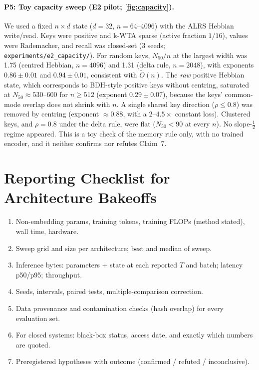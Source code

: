 \documentclass[11pt]{article}
\theoremstyle{remark}
\begin{document}
\paragraph{P5: Toy capacity sweep (E2 pilot; \cref{fig:capacity}).} We used a fixed $n\times d$ state ($d=32$, $n=64$--$4096$) with the
ALRS Hebbian write/read. Keys were positive and k-WTA sparse (active fraction $1/16$), values were Rademacher, and recall was closed-set
(3 seeds; \texttt{experiments/e2\_capacity/}). For random keys, $N_{50}/n$ at the largest width was 1.75 (centred Hebbian, $n{=}4096$) and 1.31
(delta rule, $n{=}2048$), with exponents $0.86\pm0.01$ and $0.94\pm0.01$, consistent with $\tilde O(n)$. The \emph{raw} positive
Hebbian state, which corresponds to BDH-style positive keys without centring, saturated at $N_{50}\approx530$--$600$ for $n\ge512$ (exponent
$0.29\pm0.07$), because the keys' common-mode overlap does not shrink with $n$. A single shared key direction ($\rho\le0.8$) was removed by
centring (exponent $\approx0.88$, with a $2$--$4.5\times$ constant loss). Clustered keys, and $\rho{=}0.8$ under the delta rule, were flat
($N_{50}<90$ at every $n$). No slope-$\tfrac12$ regime appeared. This is a toy check of the memory rule only, with no trained encoder, and it
neither confirms nor refutes Claim~7.

\section{Reporting Checklist for Architecture Bakeoffs}
\label{app:checklist}
\begin{enumerate}[leftmargin=*,itemsep=0pt]
\item Non-embedding params, training tokens, training FLOPs (method stated), wall time, hardware.
\item Sweep grid and size per architecture; best and median of sweep.
\item Inference bytes: parameters + state at each reported $T$ and batch; latency p50/p95; throughput.
\item Seeds, intervals, paired tests, multiple-comparison correction.
\item Data provenance and contamination checks (hash overlap) for every evaluation set.
\item For closed systems: black-box status, access date, and exactly which numbers are quoted.
\item Preregistered hypotheses with outcome (confirmed / refuted / inconclusive).
\end{enumerate}
\end{document}

